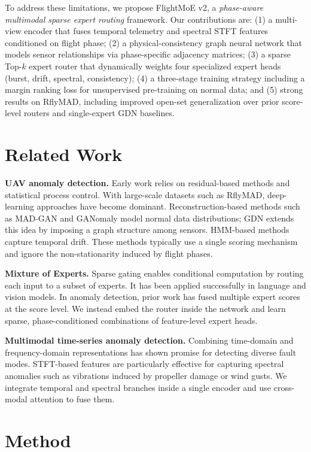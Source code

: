 \documentclass[letterpaper]{article}
\begin{document}
To address these limitations, we propose FlightMoE v2, a \emph{phase-aware multimodal sparse expert routing} framework. Our contributions are: (1) a multi-view encoder that fuses temporal telemetry and spectral STFT features conditioned on flight phase; (2) a physical-consistency graph neural network that models sensor relationships via phase-specific adjacency matrices; (3) a sparse Top-\(k\) expert router that dynamically weights four specialized expert heads (burst, drift, spectral, consistency); (4) a three-stage training strategy including a margin ranking loss for unsupervised pre-training on normal data; and (5) strong results on RflyMAD, including improved open-set generalization over prior score-level routers and single-expert GDN baselines.

\section{Related Work}
\textbf{UAV anomaly detection.} Early work relies on residual-based methods and statistical process control. With large-scale datasets such as RflyMAD, deep-learning approaches have become dominant. Reconstruction-based methods such as MAD-GAN and GANomaly model normal data distributions; GDN extends this idea by imposing a graph structure among sensors. HMM-based methods capture temporal drift. These methods typically use a single scoring mechanism and ignore the non-stationarity induced by flight phases.

\textbf{Mixture of Experts.} Sparse gating enables conditional computation by routing each input to a subset of experts. It has been applied successfully in language and vision models. In anomaly detection, prior work has fused multiple expert scores at the score level. We instead embed the router inside the network and learn sparse, phase-conditioned combinations of feature-level expert heads.

\textbf{Multimodal time-series anomaly detection.} Combining time-domain and frequency-domain representations has shown promise for detecting diverse fault modes. STFT-based features are particularly effective for capturing spectral anomalies such as vibrations induced by propeller damage or wind gusts. We integrate temporal and spectral branches inside a single encoder and use cross-modal attention to fuse them.

\section{Method}
\end{document}
